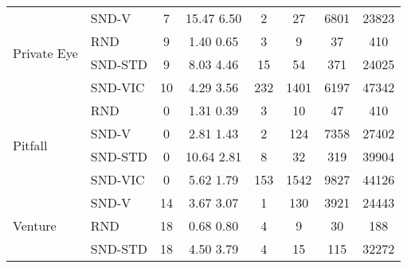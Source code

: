 \documentclass[a4paper,11pt]{elsarticle}
\begin{document}
\begin{table}[t!]
\begin{tabular}{l|l|cccccc}
\hline \multirow{4}{*}{Private Eye}
& \multicolumn{1}{l|}{SND-V} & \multicolumn{1}{c}{7} & \multicolumn{1}{c}{15.47  6.50} & \multicolumn{1}{c}{2} & \multicolumn{1}{c}{27} & \multicolumn{1}{c}{6801} & \multicolumn{1}{c}{23823} \\
& \multicolumn{1}{l|}{RND} & \multicolumn{1}{c}{9} & \multicolumn{1}{c}{1.40  0.65} & \multicolumn{1}{c}{3} & \multicolumn{1}{c}{9} & \multicolumn{1}{c}{37} & \multicolumn{1}{c}{410} \\ 
& \multicolumn{1}{l|}{SND-STD} & \multicolumn{1}{c}{9} & \multicolumn{1}{c}{8.03  4.46} & \multicolumn{1}{c}{15} & \multicolumn{1}{c}{54} & \multicolumn{1}{c}{371} & \multicolumn{1}{c}{24025} \\
& \multicolumn{1}{l|}{SND-VIC} & \multicolumn{1}{c}{10} & \multicolumn{1}{c}{4.29  3.56} & \multicolumn{1}{c}{232} & \multicolumn{1}{c}{1401} & \multicolumn{1}{c}{6197} & \multicolumn{1}{c}{47342} \\
\hline \multirow{4}{*}{Pitfall}
& \multicolumn{1}{l|}{RND} & \multicolumn{1}{c}{0} & \multicolumn{1}{c}{1.31  0.39} & \multicolumn{1}{c}{3} & \multicolumn{1}{c}{10} & \multicolumn{1}{c}{47} & \multicolumn{1}{c}{410} \\
& \multicolumn{1}{l|}{SND-V} & \multicolumn{1}{c}{0} & \multicolumn{1}{c}{2.81  1.43} & \multicolumn{1}{c}{2} & \multicolumn{1}{c}{124} & \multicolumn{1}{c}{7358} & \multicolumn{1}{c}{27402} \\
& \multicolumn{1}{l|}{SND-STD} & \multicolumn{1}{c}{0} & \multicolumn{1}{c}{10.64  2.81} & \multicolumn{1}{c}{8} & \multicolumn{1}{c}{32} & \multicolumn{1}{c}{319} & \multicolumn{1}{c}{39904} \\
& \multicolumn{1}{l|}{SND-VIC} & \multicolumn{1}{c}{0} & \multicolumn{1}{c}{5.62  1.79} & \multicolumn{1}{c}{153} & \multicolumn{1}{c}{1542} & \multicolumn{1}{c}{9827} & \multicolumn{1}{c}{44126} \\
\hline \multirow{4}{*}{Venture}
& \multicolumn{1}{l|}{SND-V} & \multicolumn{1}{c}{14} & \multicolumn{1}{c}{3.67  3.07} & \multicolumn{1}{c}{1} & \multicolumn{1}{c}{130} & \multicolumn{1}{c}{3921} & \multicolumn{1}{c}{24443} \\
& \multicolumn{1}{l|}{RND} & \multicolumn{1}{c}{18} & \multicolumn{1}{c}{0.68  0.80} & \multicolumn{1}{c}{4} & \multicolumn{1}{c}{9} & \multicolumn{1}{c}{30} & \multicolumn{1}{c}{188} \\ 
& \multicolumn{1}{l|}{SND-STD} & \multicolumn{1}{c}{18} & \multicolumn{1}{c}{4.50  3.79} & \multicolumn{1}{c}{4} & \multicolumn{1}{c}{15} & \multicolumn{1}{c}{115} & \multicolumn{1}{c}{32272} \\

\end{tabular}
\end{table}
\end{document}
